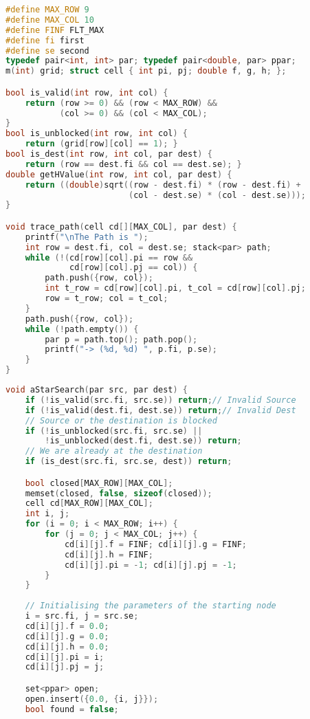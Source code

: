 \begin{lstlisting}[language=C++, title=Parte 1: Estrutura e funções auxiliares]
#define MAX_ROW 9
#define MAX_COL 10
#define FINF FLT_MAX
#define fi first
#define se second
typedef pair<int, int> par; typedef pair<double, par> ppar;
m(int) grid; struct cell { int pi, pj; double f, g, h; };

bool is_valid(int row, int col) {
	return (row >= 0) && (row < MAX_ROW) && 
	       (col >= 0) && (col < MAX_COL);
}
bool is_unblocked(int row, int col) {
	return (grid[row][col] == 1); }
bool is_dest(int row, int col, par dest) {
	return (row == dest.fi && col == dest.se); }
double getHValue(int row, int col, par dest) {
	return ((double)sqrt((row - dest.fi) * (row - dest.fi) + 
	                     (col - dest.se) * (col - dest.se)));
}

void trace_path(cell cd[][MAX_COL], par dest) {
	printf("\nThe Path is ");
	int row = dest.fi, col = dest.se; stack<par> path;
	while (!(cd[row][col].pi == row && 
	         cd[row][col].pj == col)) {
		path.push({row, col});
		int t_row = cd[row][col].pi, t_col = cd[row][col].pj;
		row = t_row; col = t_col;
	}
	path.push({row, col});
	while (!path.empty()) {
		par p = path.top(); path.pop();
		printf("-> (%d, %d) ", p.fi, p.se);
	}
}
\end{lstlisting}

\newpage

\begin{lstlisting}[language=C++, title=Parte 2: A* (Parte I)]
void aStarSearch(par src, par dest) {
	if (!is_valid(src.fi, src.se)) return;// Invalid Source
	if (!is_valid(dest.fi, dest.se)) return;// Invalid Dest
	// Source or the destination is blocked
	if (!is_unblocked(src.fi, src.se) || 
	    !is_unblocked(dest.fi, dest.se)) return;
	// We are already at the destination
	if (is_dest(src.fi, src.se, dest)) return;

	bool closed[MAX_ROW][MAX_COL];
	memset(closed, false, sizeof(closed));
	cell cd[MAX_ROW][MAX_COL];
	int i, j;
	for (i = 0; i < MAX_ROW; i++) {
		for (j = 0; j < MAX_COL; j++) {
			cd[i][j].f = FINF; cd[i][j].g = FINF;
			cd[i][j].h = FINF; 
			cd[i][j].pi = -1; cd[i][j].pj = -1;
		}
	}
	
	// Initialising the parameters of the starting node
	i = src.fi, j = src.se;
	cd[i][j].f = 0.0;
	cd[i][j].g = 0.0;
	cd[i][j].h = 0.0;
	cd[i][j].pi = i;
	cd[i][j].pj = j;

	set<ppar> open;
	open.insert({0.0, {i, j}});
	bool found = false;
\end{lstlisting}

